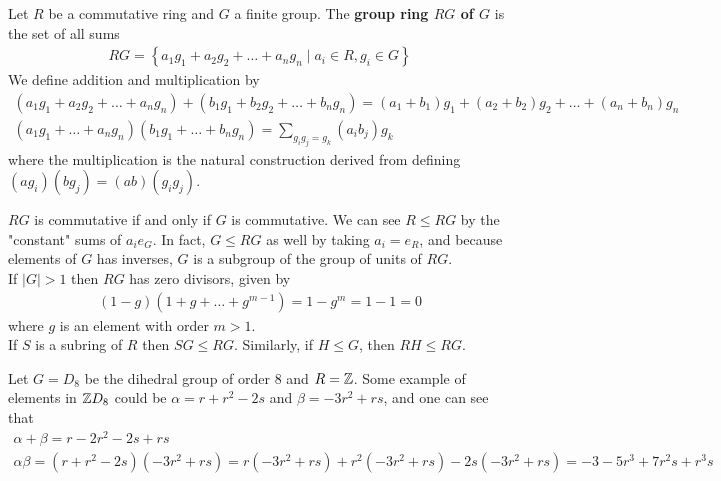 \documentclass{memoir}
\begin{document}
\begin{defn}
Let \(R\) be a commutative ring and \(G \) a finite group. The \textbf{group ring \(RG\) of \(G\)} is the set of all sums
\begin{align*}
	RG = \left\{ a_1g_1 + a_2g_2 + \ldots + a_ng_n \mid a_i\in R, g_i \in G\right\} 
\end{align*}
We define addition and multiplication by
\begin{align*}
	(a_1g_1+ a_2g_2 + \ldots + a_ng_n) + (b_1g_1 + b_2g_2 + \ldots + b_ng_n) = (a_1+b_1)g_1 + (a_2+b_2)g_2 + \ldots + (a_n+b_n)g_n\\
		(a_1g_1+ \ldots + a_ng_n)(b_1g_1 + \ldots + b_ng_n) = \sum_{g_ig_j = g_k} (a_ib_j)g_k 
\end{align*}
where the multiplication is the natural construction derived from defining \((ag_i)(bg_j) = (ab)(g_ig_j)\).
\end{defn}
\(RG\) is commutative if and only if \(G\) is commutative. We can see \(R \leq RG\) by the "constant" sums of \(a_ie_G\). In fact, \(G\leq RG\) as well by taking \(a_i = e_R\), and because elements of \(G\) has inverses, \(G\) is a subgroup of the group of units of \(RG\).\\

If \(\left| G \right| >1\) then \(RG\) has zero divisors, given by
\begin{align*}
	(1-g)(1+g+\ldots+g^{m-1}) = 1-g^{m} = 1-1 = 0
\end{align*}
where \(g\) is an element with order \(m>1\).\\

If \(S\) is a subring of \(R\) then \(SG \leq RG\). Similarly, if \(H\leq G\), then \(RH \leq RG\).

\begin{exmp}[\(\Z D_8\)]
	Let \(G = D_8\) be the dihedral group of order \(8\) and \(R = \mathbb{Z}\). Some example of elements in \(\Z D_8\) could be \(\alpha  = r + r^2 - 2s\) and \(\beta = -3r^2 + rs\), and one can see that
	\begin{align*}
		\alpha + \beta = r - 2r^2 -2s +rs\\
		\alpha \beta = (r+r^2-2s)(-3r^2+rs) = r(-3r^2+rs) + r^2(-3r^2+rs) - 2s(-3r^2+rs) = -3 - 5r^3 + 7r^2s + r^3s
	\end{align*}
\end{exmp}
\end{document}
